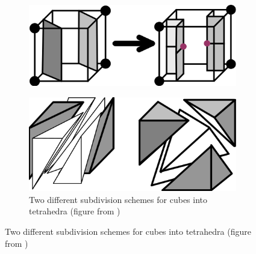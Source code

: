 \begin{itemize}
\begin{figure}
\begin{center}
\begin{subfigure}[t]{.45\textwidth}
\begin{center}
\includegraphics[width = .8\textwidth]{Pictures/SurfaceReconstruction/MCtoDualMC.png}
\end{center}
\end{subfigure}
\hfill
\begin{subfigure}[t]{.45\textwidth}
\begin{center}
\includegraphics[width = .8\textwidth]{Pictures/SurfaceReconstruction/SplittingCubes.png}
\caption{Two different subdivision schemes for cubes into tetrahedra (figure from \cite{Nielson2008})}
\label{fig:splittingCubes}
\end{center}
\end{subfigure}
\end{center}
\end{figure}

\end{itemize}
